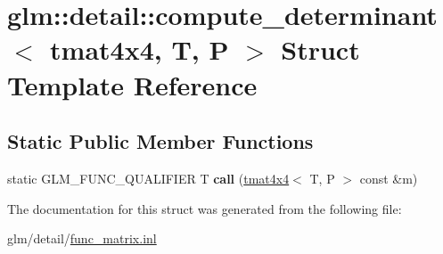 \hypertarget{structglm_1_1detail_1_1compute__determinant_3_01tmat4x4_00_01T_00_01P_01_4}{\section{glm\-:\-:detail\-:\-:compute\-\_\-determinant$<$ tmat4x4, T, P $>$ Struct Template Reference}
\label{structglm_1_1detail_1_1compute__determinant_3_01tmat4x4_00_01T_00_01P_01_4}
}
\subsection*{Static Public Member Functions}
\begin{DoxyCompactItemize}
\item 
\hypertarget{structglm_1_1detail_1_1compute__determinant_3_01tmat4x4_00_01T_00_01P_01_4_a2a40ca25a8521c5048e1b5282ae93e00}{static G\-L\-M\-\_\-\-F\-U\-N\-C\-\_\-\-Q\-U\-A\-L\-I\-F\-I\-E\-R T {\bfseries call} (\hyperlink{structglm_1_1tmat4x4}{tmat4x4}$<$ T, P $>$ const \&m)}\label{structglm_1_1detail_1_1compute__determinant_3_01tmat4x4_00_01T_00_01P_01_4_a2a40ca25a8521c5048e1b5282ae93e00}

\end{DoxyCompactItemize}


The documentation for this struct was generated from the following file\-:\begin{DoxyCompactItemize}
\item 
glm/detail/\hyperlink{func__matrix_8inl}{func\-\_\-matrix.\-inl}\end{DoxyCompactItemize}
